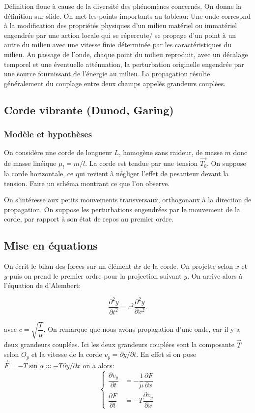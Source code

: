 \documentclass[french, a4paper, 10pt, twocolumn, landscape]{article}
\begin{document}
Définition floue à cause de la diversité des phénomènes concernés. On donne la définition sur slide. On met les points importants au tableau: Une onde correspnd à la modification des propriétés physiques d'un milieu matériel ou immatériel engendrée par une action locale qui se répercute/ se propage d'un point à un autre du milieu avec une vitesse finie déterminée par les caractéristiques du milieu. Au passage de l'onde, chaque point du milieu reproduit, avec un décalage temporel et une éventuelle atténuation, la perturbation originelle engendrée par une source fournissant de l'énergie au milieu. La propagation résulte généralement du couplage entre deux champs appelés grandeurs couplées.

\subsection*{Corde vibrante (Dunod, Garing)}

\subsubsection*{Modèle et hypothèses}
On considère une corde de longueur $L$, homogène sans raideur, de masse $m$ donc de masse linéique $\mu_l = m/l$. La corde est tendue par une tension $\vec{T_0}$. On suppose la corde horizontale, ce qui revient à négliger l'effet de pesanteur devant la tension. Faire un schéma montrant ce que l'on observe.\medskip

On s'intéresse aux petits mouvements transversaux, orthogonaux à la direction de propagation. On suppose les perturbations engendrées par le mouvement de la corde, par rapport à son état de repos au premier ordre. 

\subsection*{Mise en équations}

On écrit le bilan des forces sur un élément $dx$ de la corde. On projette selon $x$ et $y$  puis on prend le premier ordre pour la projection suivant $y$. On arrive alors à l'équation de d'Alembert:

\begin{equation}
    \dfrac{\partial^2 y}{\partial t^2} = c^2\dfrac{\partial ^2 y}{\partial x^2}.
\end{equation}

avec $c = \sqrt{\dfrac{T}{\mu}}$. On remarque que nous avons propagation d'une onde, car il y a deux grandeurs couplées. Ici les deux grandeurs couplées sont la composante $\vec{T}$ selon $O_y$ et la vitesse de la corde $v_y = \partial y/\partial t$. En effet si on pose $\vec{F}=-T\sin{\alpha}\approx -T\partial y/\partial x$ on a alors: 
\begin{equation}
    \left\{\begin{array}{ll}
        \dfrac{\partial v_y}{\partial t} &= -\dfrac{1}{\mu}\dfrac{\partial F}{\partial x}\\
        \dfrac{\partial F}{\partial t} &= -T\dfrac{\partial v_y}{\partial x}        
    \end{array}\right.
\end{equation} 
\end{document}
